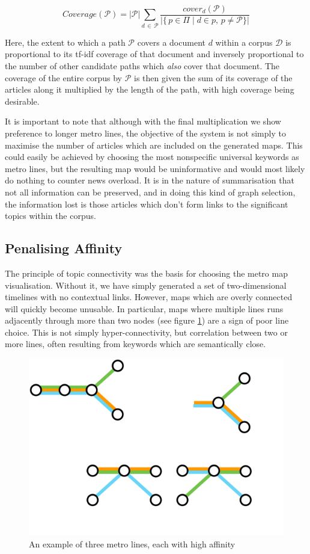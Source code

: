 \begin{equation}
	Coverage(\mathcal{P}) = {|\mathcal{P}|}\sum_{d\,\in\,\mathcal{P}}\frac{cover_{d}(\mathcal{P})}{|\{\,p\in{\Pi}\;|\;d \in p,\,p \neq \mathcal{P}\}|}
	\label{eqn:line-coverage}
\end{equation}

Here, the extent to which a path $\mathcal{P}$ covers a document $d$ within a corpus $\mathcal{D}$ is proportional to its tf-idf coverage of that document and inversely proportional to the number of other candidate paths which \textit{also} cover that document. The coverage of the entire corpus by $\mathcal{P}$ is then given the sum of its coverage of the articles along it multiplied by the length of the path, with high coverage being desirable.

It is important to note that although with the final multiplication we show preference to longer metro lines, the objective of the system is not simply to maximise the number of articles which are included on the generated maps. This could easily be achieved by choosing the most nonspecific universal keywords as metro lines, but the resulting map would be uninformative and would most likely do nothing to counter news overload. It is in the nature of summarisation that not all information can be preserved, and in doing this kind of graph selection, the information lost is those articles which don't form links to the significant topics within the corpus.

\subsection{Penalising Affinity} \label{sec:affinity}

The principle of topic connectivity was the basis for choosing the metro map visualisation. Without it, we have simply generated a set of two-dimensional timelines with no contextual links. However, maps which are overly connected will quickly become unusable. In particular, maps where multiple lines runs adjacently through more than two nodes (see figure \ref{fig:lowaffinity}) are a sign of poor line choice. This is not simply hyper-connectivity, but correlation between two or more lines, often resulting from keywords which are semantically close.

\begin{figure}[htbp!]
	\centering
	\includegraphics[width=.4\textwidth]{img/implementation/lowaffinity.pdf}
	\caption{An example of three metro lines, each with high affinity}
	\label{fig:lowaffinity}
\end{figure}

